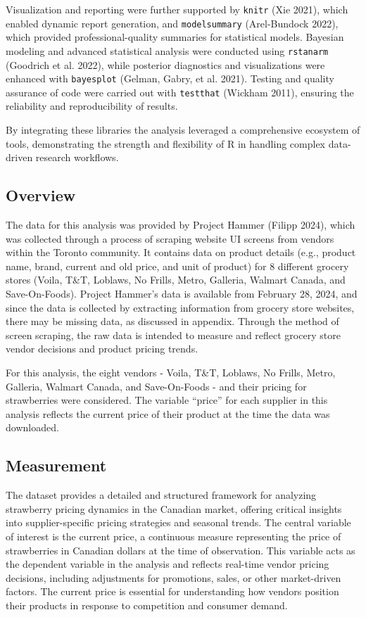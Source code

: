 \documentclass[
  letterpaper,
  DIV=11,
  numbers=noendperiod]{scrartcl}
\begin{document}
Visualization and reporting were further supported by \texttt{knitr}
(Xie 2021), which enabled dynamic report generation, and
\texttt{modelsummary} (Arel-Bundock 2022), which provided
professional-quality summaries for statistical models. Bayesian modeling
and advanced statistical analysis were conducted using \texttt{rstanarm}
(Goodrich et al. 2022), while posterior diagnostics and visualizations
were enhanced with \texttt{bayesplot} (Gelman, Gabry, et al. 2021).
Testing and quality assurance of code were carried out with
\texttt{testthat} (Wickham 2011), ensuring the reliability and
reproducibility of results.

By integrating these libraries the analysis leveraged a comprehensive
ecosystem of tools, demonstrating the strength and flexibility of R in
handling complex data-driven research workflows.

\subsection{Overview}\label{overview}

The data for this analysis was provided by Project Hammer (Filipp 2024),
which was collected through a process of scraping website UI screens
from vendors within the Toronto community. It contains data on product
details (e.g., product name, brand, current and old price, and unit of
product) for 8 different grocery stores (Voila, T\&T, Loblaws, No
Frills, Metro, Galleria, Walmart Canada, and Save-On-Foods). Project
Hammer's data is available from February 28, 2024, and since the data is
collected by extracting information from grocery store websites, there
may be missing data, as discussed in appendix. Through the method of
screen scraping, the raw data is intended to measure and reflect grocery
store vendor decisions and product pricing trends.

For this analysis, the eight vendors - Voila, T\&T, Loblaws, No Frills,
Metro, Galleria, Walmart Canada, and Save-On-Foods - and their pricing
for strawberries were considered. The variable ``price'' for each
supplier in this analysis reflects the current price of their product at
the time the data was downloaded.

\subsection{Measurement}\label{measurement}

The dataset provides a detailed and structured framework for analyzing
strawberry pricing dynamics in the Canadian market, offering critical
insights into supplier-specific pricing strategies and seasonal trends.
The central variable of interest is the current price, a continuous
measure representing the price of strawberries in Canadian dollars at
the time of observation. This variable acts as the dependent variable in
the analysis and reflects real-time vendor pricing decisions, including
adjustments for promotions, sales, or other market-driven factors. The
current price is essential for understanding how vendors position their
products in response to competition and consumer demand.
\end{document}
